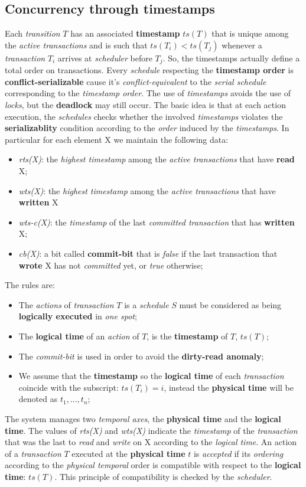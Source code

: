 \documentclass{article}
\begin{document}
\subsection{Concurrency through timestamps}
Each \emph{transition} $T$ has an associated \textbf{timestamp} $ts(T)$ that is unique among the \emph{active transactions} and is such that $ts(T_i) < ts(T_j)$ whenever a \emph{transaction} $T_i$ arrives at \emph{scheduler} before $T_j$. So, the timestamps actually define a total order on transactions. Every \emph{schedule} respecting the \textbf{timestamp order} is \textbf{conflict-serializable} cause it's \emph{conflict-equivalent} to the \emph{serial schedule} corresponding to the \emph{timestamp order}. The use of \emph{timestamps} avoids the use of \emph{locks}, but the \textbf{deadlock} may still occur. The basic idea is that at each action execution, the \emph{schedules} checks whether the involved \emph{timestamps} violates the \textbf{serializablity} condition according to the \emph{order} induced by the \emph{timestamps}. In particular for each element X we maintain the following data:
\begin{itemize}
\item \emph{rts(X)}: the \emph{highest timestamp} among the \emph{active transactions} that have \textbf{read} X;
\item \emph{wts(X)}: the \emph{highest timestamp} among the \emph{active transactions} that have \textbf{written} X 
\item \emph{wts-c(X)}: the \emph{timestamp} of the last \emph{committed transaction }that has \textbf{written} X;
\item \emph{cb(X)}: a bit called \textbf{commit-bit }that is \emph{false} if the last transaction that \textbf{wrote} X has not \emph{committed} yet, or \emph{true} otherwise;
\end{itemize}
The rules are:
\begin{itemize}
\item The \emph{actions} of \emph{transaction} $T$ is a \emph{schedule} $S$ must be considered as being \textbf{logically executed} in \emph{one spot};
\item The \textbf{logical time} of an \emph{action} of $T$, is the \textbf{timestamp} of $T$, $ts(T)$;
\item The \emph{commit-bit} is used in order to avoid the \textbf{dirty-read anomaly};
\item We assume that the \textbf{timestamp} so the \textbf{logical time} of each \emph{transaction} coincide with the subscript: $ts(T_i) = i$, instead the \textbf{physical time} will be denoted as $t_1, ... , t_n$;
\end{itemize}
The system manages two \emph{temporal axes}, the \textbf{physical time} and the \textbf{logical time}. The values of \emph{rts(X)} and \emph{wts(X)} indicate the \emph{timestamp} of the \emph{transaction} that was the last to \emph{read} and \emph{write} on X according to the \emph{logical time}. An action of a \emph{transaction} $T$ executed at the \textbf{physical time} $t$ is \emph{accepted} if its \emph{ordering} according to the \emph{physical temporal} order is compatible with respect to the \textbf{logical time}: $ts(T)$. This principle of compatibility is checked by the \emph{scheduler}.
\end{document}
